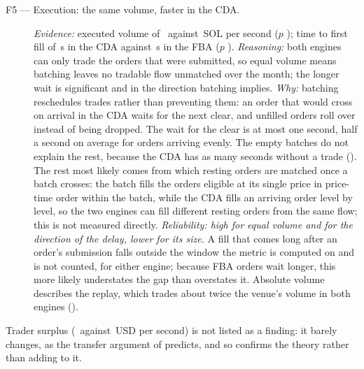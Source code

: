 \begin{description}
  \item[F5 --- Execution: the same volume, faster in the CDA.]
  \emph{Evidence:} executed volume of \ResExecVolumeCda\ against
  \ResExecVolumeFba\,SOL per second ($p$ \ResExecVolumeP); time to first
  fill of \ResTimeToExecCda\,s in the CDA against \ResTimeToExecFba\,s in
  the FBA ($p$ \ResTimeToExecP). \emph{Reasoning:} both engines can only
  trade the orders that were submitted, so equal volume means batching
  leaves no tradable flow unmatched over the month; the longer wait is
  significant and in the direction batching implies. \emph{Why:} batching
  reschedules trades rather than preventing them: an order that would
  cross on arrival in the CDA waits for the next clear, and unfilled orders
  roll over instead of being dropped. The wait for the clear is at most one
  second, half a second on average for orders arriving evenly. The empty
  batches do not explain the rest, because the CDA has as many seconds
  without a trade (). The rest most likely comes from
  which resting orders are matched once a batch crosses: the batch fills
  the orders eligible at its single price in price-time order within the
  batch, while the CDA fills an arriving order level by level, so the two
  engines can fill different resting orders from the same flow; this is
  not measured directly. \emph{Reliability: high for equal volume and for
  the direction of the delay, lower for its size.} A fill that comes long
  after an order's submission falls outside the window the metric is
  computed on and is not counted, for either engine; because FBA orders
  wait longer, this more likely understates the gap than overstates it.
  Absolute volume describes the replay, which trades about twice the
  venue's volume in both engines ().
\end{description}

Trader surplus (\ResTraderSurplusCda\ against \ResTraderSurplusFba\,USD
per second) is not listed as a finding: it barely changes, as the transfer
argument of  predicts, and so confirms the
theory rather than adding to it.


